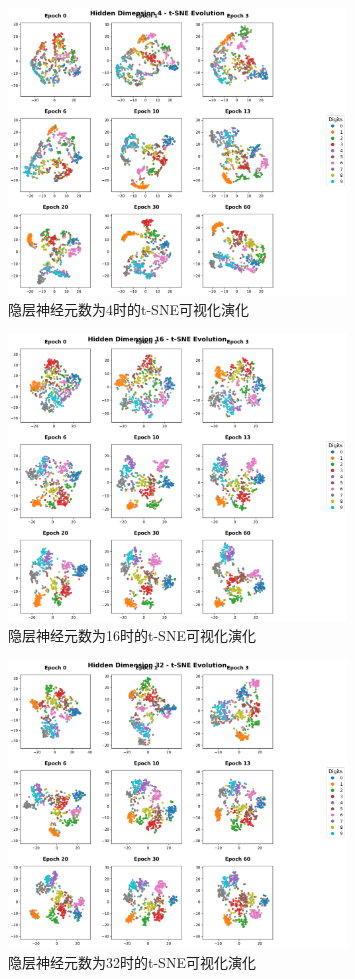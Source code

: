 \begin{figure}[H]
    \centering
    \includegraphics[width=0.8\textwidth]{../images/pa/tsne_evolution_hidden_4.png}
    \caption{隐层神经元数为4时的t-SNE可视化演化}
    \label{fig:4}
\end{figure}
\begin{figure}[H]
    \centering
    \includegraphics[width=0.8\textwidth]{../images/pa/tsne_evolution_hidden_16.png}
    \caption{隐层神经元数为16时的t-SNE可视化演化}
    \label{fig:16}
\end{figure}
\begin{figure}[H]
    \centering
    \includegraphics[width=0.8\textwidth]{../images/pa/tsne_evolution_hidden_32.png}
    \caption{隐层神经元数为32时的t-SNE可视化演化}
    \label{fig:32}
\end{figure}
